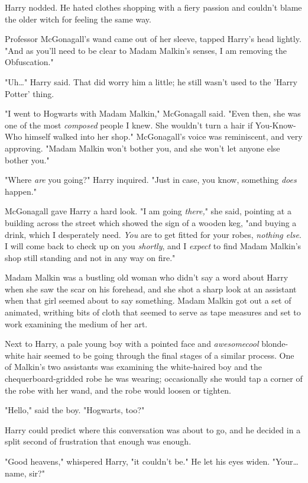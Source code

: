 Harry nodded. He hated clothes shopping with a fiery passion and couldn't blame 
the older witch for feeling the same way.

Professor McGonagall's wand came out of her sleeve, tapped Harry's head 
lightly. "And as you'll need to be clear to Madam Malkin's senses, I am 
removing the Obfuscation."

"Uh{\ldots}" Harry said. That did worry him a little; he still wasn't used to 
the 'Harry Potter' thing.

"I went to Hogwarts with Madam Malkin," McGonagall said. "Even then, she was 
one of the most \emph{composed} people I knew. She wouldn't turn a hair if 
You-Know-Who himself walked into her shop." McGonagall's voice was reminiscent, 
and very approving. "Madam Malkin won't bother you, and she won't let anyone 
else bother you."

"Where \emph{are} you going?" Harry inquired. "Just in case, you know, 
something \emph{does} happen."

McGonagall gave Harry a hard look. "I am going \emph{there,}" she said, 
pointing at a building across the street which showed the sign of a wooden keg, 
"and buying a drink, which I desperately need. \emph{You} are to get fitted for 
your robes, \emph{nothing else}. I will come back to check up on you 
\emph{shortly}, and I \emph{expect} to find Madam Malkin's shop still standing 
and not in any way on fire."

Madam Malkin was a bustling old woman who didn't say a word about Harry when 
she saw the scar on his forehead, and she shot a sharp look at an assistant 
when that girl seemed about to say something. Madam Malkin got out a set of 
animated, writhing bits of cloth that seemed to serve as tape measures and set 
to work examining the medium of her art.

Next to Harry, a pale young boy with a pointed face and \emph{awesomecool} 
blonde-white hair seemed to be going through the final stages of a similar 
process. One of Malkin's two assistants was examining the white-haired boy and 
the chequerboard-gridded robe he was wearing; occasionally she would tap a 
corner of the robe with her wand, and the robe would loosen or tighten.

"Hello," said the boy. "Hogwarts, too?"

Harry could predict where this conversation was about to go, and he decided in 
a split second of frustration that enough was enough.

"Good heavens," whispered Harry, "it couldn't be." He let his eyes widen. 
"Your{\ldots} name, sir?"

